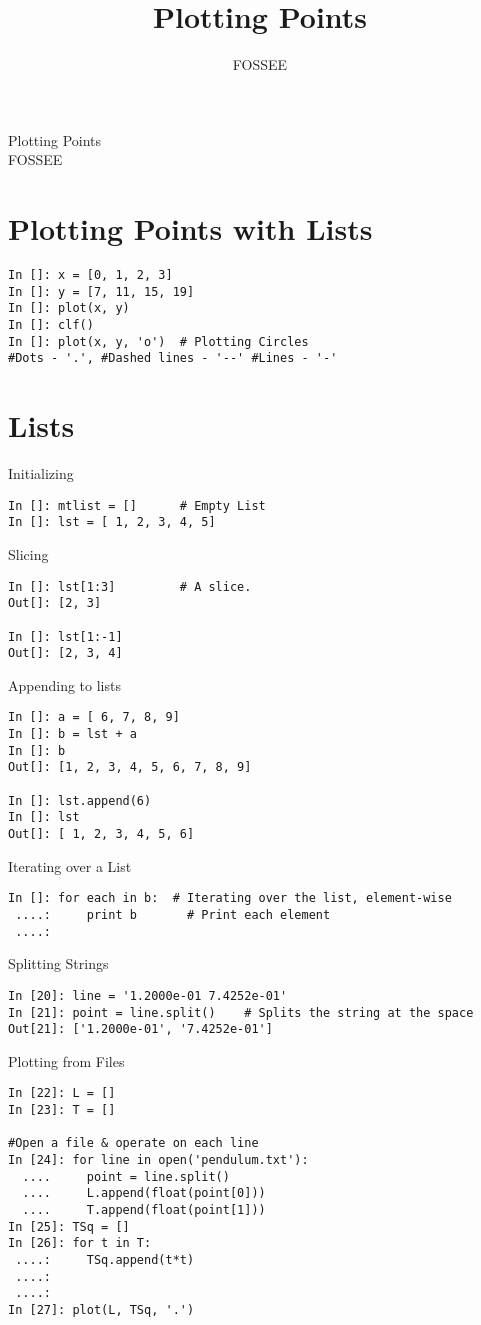 \documentclass[12pt]{article}
\title{Plotting Points}
\author{FOSSEE}
\begin{document}
\date{}
\vspace{-1in}
\begin{center}
\LARGE{Plotting Points}\\
\large{FOSSEE}
\end{center}

\section{Plotting Points with Lists}

\begin{lstlisting}
In []: x = [0, 1, 2, 3]
In []: y = [7, 11, 15, 19]
In []: plot(x, y)
In []: clf()
In []: plot(x, y, 'o')  # Plotting Circles
#Dots - '.', #Dashed lines - '--' #Lines - '-'
\end{lstlisting}

\section{Lists}

Initializing
  \begin{lstlisting}
In []: mtlist = []      # Empty List
In []: lst = [ 1, 2, 3, 4, 5] 
  \end{lstlisting}
Slicing
\begin{lstlisting}
In []: lst[1:3]         # A slice.
Out[]: [2, 3]

In []: lst[1:-1]
Out[]: [2, 3, 4]
\end{lstlisting}
Appending to lists
\begin{lstlisting}
In []: a = [ 6, 7, 8, 9]
In []: b = lst + a
In []: b
Out[]: [1, 2, 3, 4, 5, 6, 7, 8, 9]

In []: lst.append(6)
In []: lst
Out[]: [ 1, 2, 3, 4, 5, 6]
\end{lstlisting}
Iterating over a List
\begin{lstlisting}
In []: for each in b:  # Iterating over the list, element-wise
 ....:     print b       # Print each element
 ....:
\end{lstlisting}

Splitting Strings
\begin{lstlisting}
In [20]: line = '1.2000e-01 7.4252e-01'
In [21]: point = line.split()    # Splits the string at the space
Out[21]: ['1.2000e-01', '7.4252e-01']
\end{lstlisting}

Plotting from Files
\begin{lstlisting}
In [22]: L = []
In [23]: T = []

#Open a file & operate on each line
In [24]: for line in open('pendulum.txt'):  
  ....     point = line.split()
  ....     L.append(float(point[0]))
  ....     T.append(float(point[1]))
In [25]: TSq = []
In [26]: for t in T:
 ....:     TSq.append(t*t)
 ....:     
 ....:     
In [27]: plot(L, TSq, '.')
\end{lstlisting}
\end{document}
